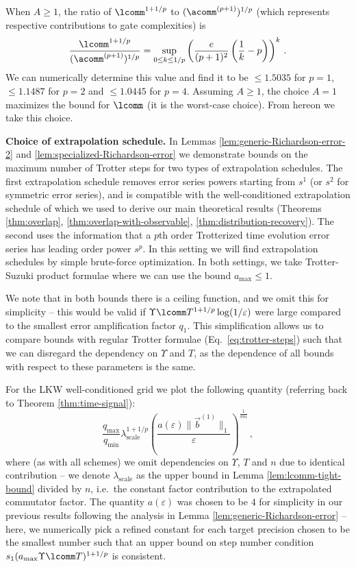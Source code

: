 When $A \geq 1$, the ratio of $\lcomm^{1+1/p}$ to $(\acomm^{(p+1)})^{1/p}$ (which represents respective contributions to gate complexities) is
\begin{equation}
    \frac{\lcomm^{1+1/p}}{(\acomm^{(p+1)})^{1/p}} = \sup_{0\leq k \leq 1/p} \left(\frac{e }{(p + 1)^{2}}\left( \frac{1}{k} - p \right) \right)^{k}\,.
\end{equation}
We can numerically determine this value and find it to be $\leq 1.5035$ for $p=1$, $\leq 1.1487$ for $p=2$ and $\leq 1.0445$ for $p=4$. Assuming $A\geq 1$, the choice $A=1$ maximizes the bound for $\lcomm$ (it is the worst-case choice). From hereon we take this choice.

\medskip

\textbf{Choice of extrapolation schedule.} In Lemmas \ref{lem:generic-Richardson-error-2} and \ref{lem:specialized-Richardson-error} we demonstrate bounds on the maximum number of Trotter steps for two types of extrapolation schedules. The first extrapolation schedule removes error series powers starting from $s^1$ (or $s^2$ for symmetric error series), and is compatible with the well-conditioned extrapolation schedule of \cite{low2019Multiproduct} which we used to derive our main theoretical results (Theorems \ref{thm:overlap}, \ref{thm:overlap-with-observable}, \ref{thm:distribution-recovery}). The second uses the information that a $p$th order Trotterized time evolution error series has leading order power $s^p$. In this setting we will find extrapolation schedules by simple brute-force optimization. In both settings, we take Trotter-Suzuki product formulae where we can use the bound $a_{\max} \leq 1$.

We note that in both bounds there is a ceiling function, and we omit this for simplicity -- this would be valid if $\Upsilon \lcomm T^{1+1/p} \log(1/\varepsilon)$ were large compared to the smallest error amplification factor $q_1$. This simplification allows us to compare bounds with regular Trotter formulae (Eq.~\eqref{eq:trotter-steps}) such that we can disregard the dependency on $\Upsilon$ and $T$, as the dependence of all bounds with respect to these parameters is the same.

For the LKW well-conditioned grid we plot the following quantity (referring back to Theorem \ref{thm:time-signal}):
\begin{equation}
    \frac{q_{\max}}{q_{\min}} \lambda_{\text{scale}}^{1+1/p} \left(\frac{a(\varepsilon)\|\vec{b}^{(1)}\|_1}{\varepsilon}\right)^{\frac{1}{\sigma m}}\,,
\end{equation}
where (as with all schemes) we omit dependencies on $\Upsilon$, $T$ and $n$ due to identical contribution -- we denote $\lambda_{\text{scale}}$ as the upper bound in Lemma \ref{lem:lcomm-tight-bound} divided by $n$, i.e.~the constant factor contribution to the extrapolated commutator factor. The quantity $a(\varepsilon)$ was chosen to be $4$ for simplicity in our previous results following the analysis in Lemma \ref{lem:generic-Richardson-error} -- here, we numerically pick a refined constant for each target precision chosen to be the smallest number such that an upper bound on step number condition $s_1 (a_{\max } \Upsilon \lcomm T)^{1+1/p}$ is consistent. 


